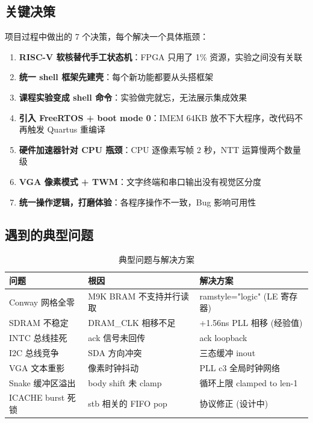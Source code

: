 \documentclass{SYSUReport}
\begin{document}
\subsection{关键决策}

项目过程中做出的 7 个决策，每个解决一个具体瓶颈：

\begin{enumerate}
    \item \textbf{RISC-V 软核替代手工状态机}：FPGA 只用了 1\% 资源，实验之间没有关联
    \item \textbf{统一 shell 框架先建壳}：每个新功能都要从头搭框架
    \item \textbf{课程实验变成 shell 命令}：实验做完就忘，无法展示集成效果
    \item \textbf{引入 FreeRTOS + boot mode 0}：IMEM 64KB 放不下大程序，改代码不再触发 Quartus 重编译
    \item \textbf{硬件加速器针对 CPU 瓶颈}：CPU 逐像素写帧 2 秒，NTT 运算慢两个数量级
    \item \textbf{VGA 像素模式 + TWM}：文字终端和串口输出没有视觉区分度
    \item \textbf{统一操作逻辑，打磨体验}：各程序操作不一致，Bug 影响可用性
\end{enumerate}

\subsection{遇到的典型问题}

\begin{table}[!htbp]
    \centering
    \small
    \begin{tabular}{l|l|l}
        \hline
        \textbf{问题} & \textbf{根因} & \textbf{解决方案} \\
        \hline
        Conway 网格全零 & M9K BRAM 不支持并行读取 & ramstyle="logic" (LE 寄存器) \\
        SDRAM 不稳定 & DRAM\_CLK 相移不足 & +1.56ns PLL 相移 (经验值) \\
        INTC 总线挂死 & ack 信号未回传 & ack loopback \\
        I2C 总线竞争 & SDA 方向冲突 & 三态缓冲 inout \\
        VGA 文本重影 & 像素时钟抖动 & PLL c3 全局时钟网络 \\
        Snake 缓冲区溢出 & body shift 未 clamp & 循环上限 clamped to len-1 \\
        ICACHE burst 死锁 & stb 相关的 FIFO pop & 协议修正 (设计中) \\
        \hline
    \end{tabular}
    \caption{典型问题与解决方案}
\end{table}
\end{document}

